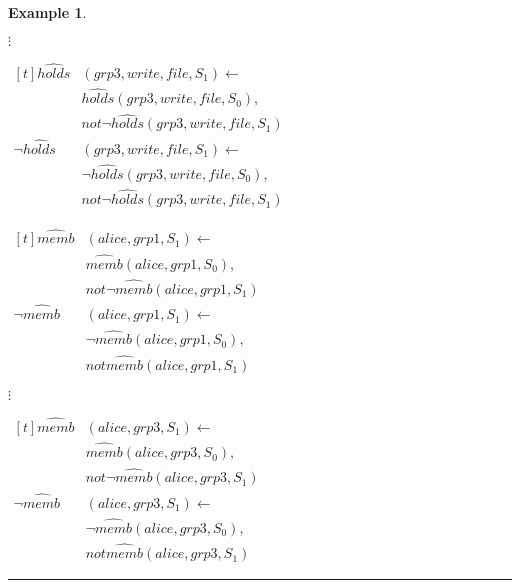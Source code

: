 \documentclass[11pt, twocolumn]{article}
\newtheorem{vexmpl}{Example}
\newenvironment{vexample}
  {\begin{vexmpl}\rm}
  {\rule{2mm}{2mm}\end{vexmpl}}
\begin{document}
\begin{vexample}
\begin{enumerate}
              \hspace{1cm} $\vdots$

              \begin{math}
                \begin{aligned}[t]
                  \hat{holds}&(grp3, write, file, S_{1}) \leftarrow \\
                  & \hat{holds}(grp3, write, file, S_{0}), \\
                  & not \lnot \hat{holds}(grp3, write, file, S_{1}) \\
                  \lnot \hat{holds}&(grp3, write, file, S_{1}) \leftarrow \\
                  & \lnot \hat{holds}(grp3, write, file, S_{0}), \\
                  & not \lnot \hat{holds}(grp3, write, file, S_{1})
                \end{aligned}
              \end{math}

              \begin{math}
                \begin{aligned}[t]
                  \hat{memb}&(alice, grp1, S_{1}) \leftarrow \\
                  & \hat{memb}(alice, grp1, S_{0}), \\
                  & not \lnot \hat{memb}(alice, grp1, S_{1}) \\
                  \lnot \hat{memb}&(alice, grp1, S_{1}) \leftarrow \\
                  & \lnot \hat{memb}(alice, grp1, S_{0}), \\
                  & not \hat{memb}(alice, grp1, S_{1})
                \end{aligned}
              \end{math}

              \hspace{1cm} $\vdots$

              \begin{math}
                \begin{aligned}[t]
                  \hat{memb}&(alice, grp3, S_{1}) \leftarrow \\
                  & \hat{memb}(alice, grp3, S_{0}), \\
                  & not \lnot \hat{memb}(alice, grp3, S_{1}) \\
                  \lnot \hat{memb}&(alice, grp3, S_{1}) \leftarrow \\
                  & \lnot \hat{memb}(alice, grp3, S_{0}), \\
                  & not \hat{memb}(alice, grp3, S_{1})
                \end{aligned}
              \end{math}


\end{enumerate}
\end{vexample}
\end{document}
